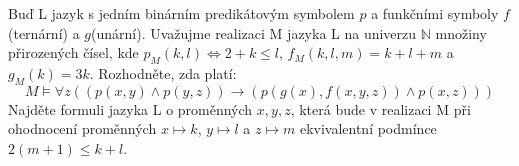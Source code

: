 Buď L jazyk s jedním binárním predikátovým symbolem $p$ a funkčními symboly
$f$(ternární) a $g$(unární). Uvažujme realizaci M jazyka L na univerzu
$\mathbb{N}$ množiny přirozených čísel, kde $p_{M}(k,l) \Leftrightarrow 2+k
\leq l$, $f_{M}(k,l,m)=k+l+m$ a $g_{M}(k)=3k$. Rozhodněte, zda platí:
$$M \models \forall z ((p(x,y) \wedge p(y,z)) \rightarrow (p(g(x),f(x,y,z))
\wedge p(x,z)))$$
Najděte formuli jazyka L o proměnných $x,y,z$, která bude v realizaci M při
ohodnocení proměnných $x \mapsto k$, $y \mapsto l$ a $z \mapsto m$ ekvivalentní
podmínce $2(m+1)\leq k+l$.

